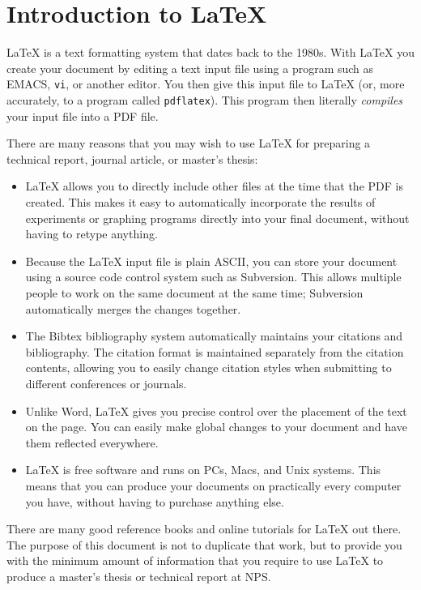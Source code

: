 \chapter{Introduction to \LaTeX}
\LaTeX{} is a text formatting system that dates back to the 1980s. With 
\LaTeX{} you create your document by editing a text input file using a
program such as EMACS, \verb+vi+, or another editor. You then give
this input file to \LaTeX{} (or, more accurately, to a program called
\verb+pdflatex+). This program then literally \emph{compiles} your
input file into a PDF file.

There are many reasons that you may wish to use \LaTeX{} for preparing
a technical report, journal article, or master's thesis:

\begin{itemize}
\item \LaTeX{} allows you to directly include other files at the time
  that the PDF is created. This makes it easy to automatically
  incorporate the results of experiments or graphing programs directly
  into your final document, without having to retype anything.
\item Because the \LaTeX{} input file is plain ASCII, you can store
  your document using a source code control system such as
  Subversion\cite{subversion}. This allows multiple people to work on
  the same document at the same time; Subversion automatically merges
  the changes together.
\item The Bibtex bibliography system automatically maintains your
  citations and bibliography. The citation format is maintained
  separately from the citation contents, allowing you to easily change
  citation styles when submitting to different conferences or journals.
\item Unlike Word, \LaTeX{} gives you precise control over the
  placement of the text on the page. You can easily make global changes
  to your document and have them reflected everywhere. 
\item \LaTeX{} is free software and runs on PCs, Macs, and Unix
  systems. This means that you can produce your documents on
  practically every computer you have, without having to purchase
  anything else.
\end{itemize}

There are many good reference books and online tutorials for \LaTeX
out there. The purpose of this document is not to duplicate that work,
but to provide you with the minimum amount of information that you
require to use \LaTeX{} to produce a master's thesis or technical
report at NPS.


